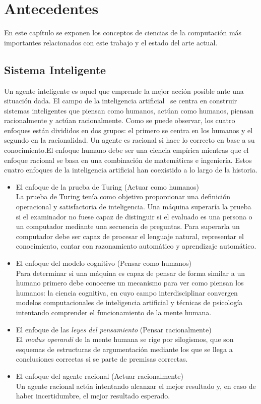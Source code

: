 \chapter{Antecedentes}
\label{cap:Antecedentes}
En este capítulo se exponen los conceptos de ciencias de la computación más importantes relacionados con este trabajo y el estado del arte actual.\\

\section{Sistema Inteligente}
Un agente inteligente es aquel que emprende la mejor acción posible ante una situación dada. El campo de la inteligencia artificial~\cite{Russ06} se centra en construir sistemas inteligentes que piensan como humanos, actúan como humanos, piensan racionalmente y actúan racionalmente. Como se puede observar, los cuatro enfoques están divididos en dos grupos: el primero se centra en los humanos y el segundo en la racionalidad. Un agente es racional si hace lo correcto en base a su conocimiento.El enfoque humano debe ser una ciencia empírica mientras que el enfoque racional se basa en una combinación de matemáticas e ingeniería. Estos cuatro enfoques de la inteligencia artificial han coexistido a lo largo de la historia.\\
\begin{itemize}
\item{El enfoque de la prueba de Turing (Actuar como humanos)}\\

  La prueba de Turing tenía como objetivo proporcionar una definición operacional y satisfactoria de inteligencia. Una máquina superaría la prueba si el examinador no fuese capaz de distinguir si el evaluado es una persona o un computador mediante una secuencia de preguntas. Para superarla un computador debe ser capaz de procesar el lenguaje natural, representar el conocimiento, contar con razonamiento automático y aprendizaje automático.
\item{El enfoque del modelo cognitivo (Pensar como humanos)}\\

Para determinar si una máquina es capaz de pensar de forma similar a un humano primero debe conocerse un mecanismo para ver como piensan los humanos: la ciencia cognitiva, en cuyo campo interdisciplinar convergen modelos computacionales de inteligencia artificial y técnicas de psicología intentando comprender el funcionamiento de la mente humana.
\item{El enfoque de las \textit{leyes del pensamiento} (Pensar racionalmente)}\\

  El \textit{modus operandi} de la mente humana se rige por silogismos, que son esquemas de estructuras de argumentación mediante los que se llega a conclusiones correctas si se parte de premisas correctas.
\item{El enfoque del agente racional (Actuar racionalmente)}\\

  Un agente racional actúa intentando alcanzar el mejor resultado y, en caso de haber incertidumbre, el mejor resultado esperado.
\end{itemize}
